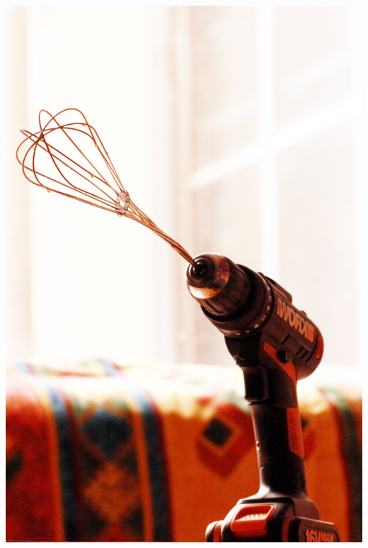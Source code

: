 \documentclass[12pt, table]{beamer}
\begin{document}
\begin{frame}
\begin{center}
{\begin{center}
				\includegraphics[height=0.7\textheight]{../img/schneeschrauber.jpg}
			\end{center}
			}
\end{center}
\end{frame}
\end{document}
